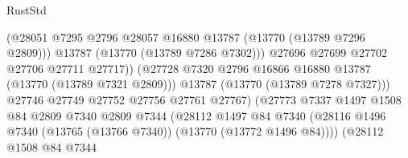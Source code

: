\begin{lexlean}{RustStd}
\begin{coremodule}
                                              (@28051
                                                @7295
                                                @2796
                                                @28057
                                                @16880
                                                @13787
                                                (@13770 (@13789 @7296 @2809)))
                                              @13787
                                              (@13770 (@13789 @7286 @7302)))
                                            @27696
                                            @27699
                                            @27702
                                            @27706
                                            @27711
                                            @27717))
                                        (@27728
                                          @7320
                                          @2796
                                          @16866
                                          @16880
                                          @13787
                                          (@13770 (@13789 @7321 @2809)))
                                        @13787
                                        (@13770 (@13789 @7278 @7327)))
                                      @27746
                                      @27749
                                      @27752
                                      @27756
                                      @27761
                                      @27767)
                                    (@27773
                                      @7337
                                      @1497
                                      @1508
                                      @84
                                      @2809
                                      @7340
                                      @2809
                                      @7344
                                      (@28112
                                        @1497
                                        @84
                                        @7340
                                        (@28116
                                          @1496
                                          @7340
                                          (@13765 (@13766 @7340))
                                          (@13770 (@13772 @1496 @84))))
                                      (@28112
                                        @1508
                                        @84
                                        @7344

\end{coremodule}
\end{lexlean}
